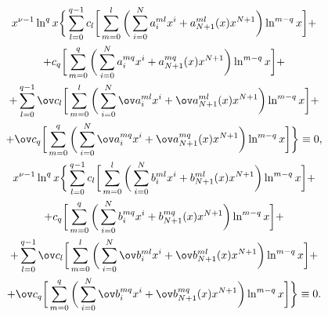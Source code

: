 \begin{gather*} 


x^{\nu-1}\ln^q x\bigg\{\sum^{q-1}_{l=0}c_l 


\bigg[\sum^l_{m=0}\bigg(\sum^N_{i=0}a^{ml}_i x^i+ 


a^{ml}_{N+1}(x)x^{N+1}\bigg)\ln^{m-q}x\bigg]+\\ +c_q 


\bigg[\sum^q_{m=0}\bigg(\sum^N_{i=0}a^{mq}_i x^i+ 


a^{mq}_{N+1}(x)x^{N+1}\bigg)\ln^{m-q}x\bigg]+ \\ 


% 


+\sum^{q-1}_{l=0}\ov c_l 


\bigg[\sum^l_{m=0}\bigg(\sum^N_{i=0}\ov a^{ml}_i x^i+ 


\ov a^{ml}_{N+1}(x)x^{N+1}\bigg)\ln^{m-q}x\bigg]+\\ +\ov c_q 


\bigg[\sum^q_{m=0}\bigg(\sum^N_{i=0}\ov a^{mq}_i x^i+ 


\ov a^{mq}_{N+1}(x)x^{N+1}\bigg)\ln^{m-q}x\bigg]\bigg\}\equiv0,\\ 


% 


% 


x^{\nu-1}\ln^q x\bigg\{\sum^{q-1}_{l=0}c_l 


\bigg[\sum^l_{m=0}\bigg(\sum^N_{i=0}b^{ml}_i x^i+ 


b^{ml}_{N+1}(x)x^{N+1}\bigg)\ln^{m-q}x\bigg]+\\ +c_q 


\bigg[\sum^q_{m=0}\bigg(\sum^N_{i=0}b^{mq}_i x^i+ 


b^{mq}_{N+1}(x)x^{N+1}\bigg)\ln^{m-q}x\bigg]+ \\ 


% 


+\sum^{q-1}_{l=0}\ov c_l 


\bigg[\sum^l_{m=0}\bigg(\sum^N_{i=0}\ov b^{ml}_i x^i+ 


\ov b^{ml}_{N+1}(x)x^{N+1}\bigg)\ln^{m-q}x\bigg]+\\ +\ov c_q 


\bigg[\sum^q_{m=0}\bigg(\sum^N_{i=0}\ov b^{mq}_i x^i+ 


\ov b^{mq}_{N+1}(x)x^{N+1}\bigg)\ln^{m-q}x\bigg]\bigg\}\equiv0.


\end{gather*} 


 


